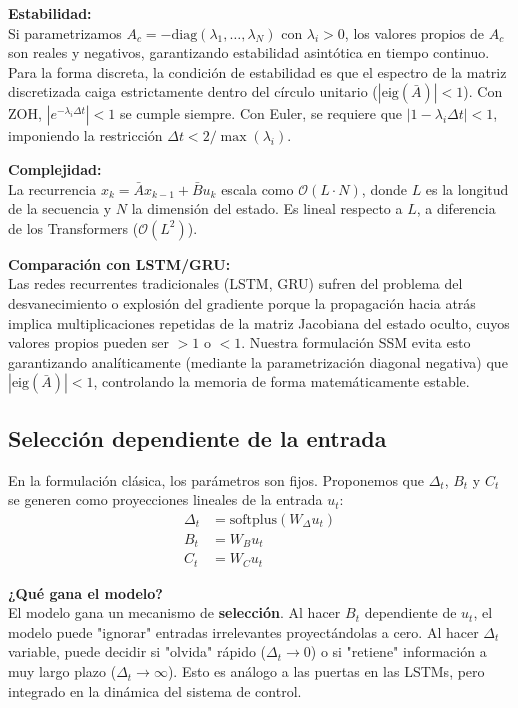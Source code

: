 \documentclass[12pt,a4paper]{article}
\begin{document}
\textbf{Estabilidad:}\\
Si parametrizamos $A_c = -\text{diag}(\lambda_1, \dots, \lambda_N)$ con $\lambda_i > 0$, los valores propios de $A_c$ son reales y negativos, garantizando estabilidad asintótica en tiempo continuo. Para la forma discreta, la condición de estabilidad es que el espectro de la matriz discretizada caiga estrictamente dentro del círculo unitario ($|\text{eig}(\bar{A})| < 1$). Con ZOH, $|e^{-\lambda_i \Delta t}| < 1$ se cumple siempre. Con Euler, se requiere que $|1 - \lambda_i \Delta t| < 1$, imponiendo la restricción $\Delta t < 2/\max(\lambda_i)$.

\textbf{Complejidad:}\\
La recurrencia $x_k = \bar{A} x_{k-1} + \bar{B} u_k$ escala como $\mathcal{O}(L \cdot N)$, donde $L$ es la longitud de la secuencia y $N$ la dimensión del estado. Es lineal respecto a $L$, a diferencia de los Transformers ($\mathcal{O}(L^2)$).

\textbf{Comparación con LSTM/GRU:}\\
Las redes recurrentes tradicionales (LSTM, GRU) sufren del problema del desvanecimiento o explosión del gradiente porque la propagación hacia atrás implica multiplicaciones repetidas de la matriz Jacobiana del estado oculto, cuyos valores propios pueden ser $>1$ o $<1$. Nuestra formulación SSM evita esto garantizando analíticamente (mediante la parametrización diagonal negativa) que $|\text{eig}(\bar{A})| < 1$, controlando la memoria de forma matemáticamente estable.

\subsection{Selección dependiente de la entrada}

En la formulación clásica, los parámetros son fijos. Proponemos que $\Delta_t$, $B_t$ y $C_t$ se generen como proyecciones lineales de la entrada $u_t$:
\begin{align}
\Delta_t &= \text{softplus}(W_\Delta u_t) \\
B_t &= W_B u_t \\
C_t &= W_C u_t
\end{align}

\textbf{¿Qué gana el modelo?}\\
El modelo gana un mecanismo de \textbf{selección}. Al hacer $B_t$ dependiente de $u_t$, el modelo puede "ignorar" entradas irrelevantes proyectándolas a cero. Al hacer $\Delta_t$ variable, puede decidir si "olvida" rápido ($\Delta_t \to 0$) o si "retiene" información a muy largo plazo ($\Delta_t \to \infty$). Esto es análogo a las puertas en las LSTMs, pero integrado en la dinámica del sistema de control.
\end{document}
